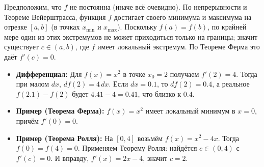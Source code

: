 \begin{customproof}
	Предположим, что $f$ не постоянна (иначе всё очевидно). По непрерывности и
	Теореме Вейерштрасса, функция $f$ достигает своего минимума и максимума
	на отрезке $[a,b]$ (в точках $x_{\min}$ и $x_{\max}$).
	Поскольку $f(a)=f(b)$, по крайней мере один из этих экстремумов
	не может приходиться только на границы; значит существует $c\in(a,b)$,
	где $f$ имеет локальный экстремум. По Теореме Ферма это даёт $f'(c)=0$.
\end{customproof}

\begin{customexample}
	\begin{itemize}
		\item \textbf{Дифференциал:}
		      Для $f(x)=x^2$ в точке $x_0=2$ получаем $f'(2)=4$. Тогда
		      при малом $dx$, $df(2) = 4\,dx$. Если $dx=0.1$, то $df(2)=0.4$, а
		      реальное $f(2.1)-f(2)$ будет $4.41-4=0.41$, что близко к $0.4$.
		\item \textbf{Пример (Теорема Ферма):}
		      $f(x)=x^2$ имеет локальный минимум в $x=0$, причём $f'(0)=0$.
		\item \textbf{Пример (Теорема Ролля):}
		      На $[0,4]$ возьмём $f(x)=x^2 - 4x$. Тогда $f(0)=f(4)=0$.
		      Применяем Теорему Ролля: найдётся $c\in(0,4)$ с $f'(c)=0$.
		      И вправду, $f'(x)=2x-4$, значит $c=2$.
	\end{itemize}
\end{customexample}
